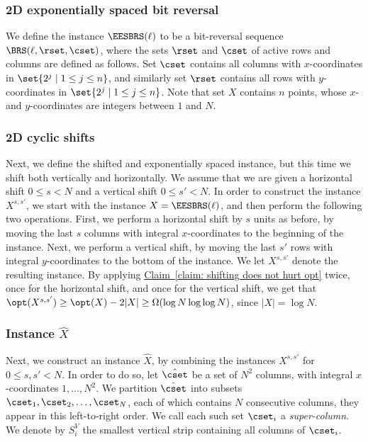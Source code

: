 \documentclass[11pt]{article}
\numberwithin{equation}{section}
\theoremstyle{definition}
\theoremstyle{plain}
\newcommand{\expref}[2]{\hyperref[#2]{#1~\ref{#2}}}
\begin{document}
\subsubsection{2D exponentially spaced bit reversal} 

We define the instance $\EESBRS(\ell)$ to be a bit-reversal sequence $\BRS(\ell,\rset,\cset)$, where the sets $\rset$ and $\cset$ of active rows and columns are defined as follows. Set $\cset$ contains all columns with $x$-coordinates in $\set{2^j\mid 1\leq j\leq n}$, and similarly set $\rset$ contains all rows with $y$-coordinates in $\set{2^j\mid 1\leq j\leq n}$. Note that set $X$ contains $n$ points, whose $x$- and $y$-coordinates are integers between $1$ and $N$.


 

%
%
	
	
\subsubsection{2D cyclic shifts} 

Next, we define the shifted and exponentially spaced instance, but this time we shift both vertically and horizontally. 
We assume that we are given a horizontal shift $0\leq s<N$ and a vertical shift $0\leq s'<N$. 
In order to construct the instance $X^{s,s'}$, we start with the instance $X=\EESBRS(\ell)$, and then perform the following two operations. 
First, we perform a horizontal shift by $s$ units as before, by moving the last $s$ columns with integral $x$-coordinates  to the beginning of the instance. 
Next, we perform a vertical shift, by moving the last $s'$ rows with integral $y$-coordinates to the bottom of the instance. 
We let $X^{s,s'}$ denote the resulting instance. 
By applying \expref{Claim}{claim: shifting does not hurt opt} twice, once for the horizontal shift, and once for the vertical shift, we get that $\opt(X^{s,s'})\geq \opt(X)-2|X|\geq \Omega(\log N\log\log N)$, since $|X|=\log N$.




\subsubsection{Instance $\hat{X}$} 

Next, we construct an instance $\hat X$, by combining the instances $X^{s,s'}$ for $0\leq s,s'<N$. 
In order to do so, let $\hat \cset$ be a set of $N^2$ columns, with integral $x$-coordinates $1,\ldots,N^2$. We partition $\hat \cset$ into subsets $\cset_1, \cset_2,\ldots,\cset_N$, each of which contains $N$ consecutive columns, they appear in this left-to-right order. 
We call each such set $\cset_i$ a \emph{super-column}. We denote by $S^V_i$ the smallest vertical strip containing all columns of $\cset_i$.
\end{document}
